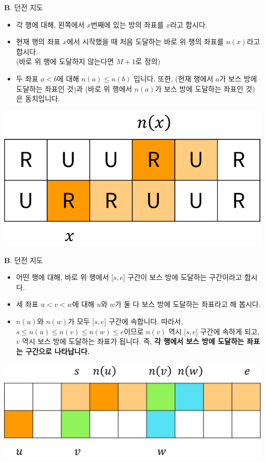 \begin{frame}{\textbf{B}. 던전 지도}
    \vspace{14pt}
    \begin{itemize}
        \item 각 행에 대해, 왼쪽에서 $x$번째에 있는 방의 좌표를 $x$라고 합시다.
        \item 현재 행의 좌표 $x$에서 시작했을 때 처음 도달하는 바로 위 행의 좌표를 $n(x)$라고 합시다. \\
        (바로 위 행에 도달하지 않는다면 $M+1$로 정의)
        \item 두 좌표 $a < b$에 대해 $n(a) \le n(b)$ 입니다. 또한, (현재 행에서 $a$가 보스 방에 도달하는 좌표인 것)과 (바로 위 행에서 $n(a)$가 보스 방에 도달하는 좌표인 것)은 동치입니다.
    \end{itemize}
    \begin{center}
        \includegraphics[width=0.35\linewidth]{../images/dungeon-map/b-basic.png}
    \end{center}
\end{frame}
        
\begin{frame}{\textbf{B}. 던전 지도}
    \vspace{14pt}
    \begin{itemize}
        \item 어떤 행에 대해, 바로 위 행에서 [$s, e$] 구간이 보스 방에 도달하는 구간이라고 합시다.
        \item 세 좌표 $u < v < w$에 대해 $u$와 $w$가 둘 다 보스 방에 도달하는 좌표라고 해 봅시다.
        \item $n(u)$와 $n(w)$가 모두 [$s, e$] 구간에 속합니다. 따라서, $s \le n(u) \le n(v) \le n(w) \le e$이므로 $n(v)$ 역시 [$s, e$] 구간에 속하게 되고, $v$ 역시 보스 방에 도달하는 좌표가 됩니다. 즉, \textbf{각 행에서 보스 방에 도달하는 좌표는 구간으로 나타납니다.}
    \end{itemize}
    \begin{center}
        \includegraphics[width=0.5\linewidth]{../images/dungeon-map/b-proof.png}
    \end{center}
\end{frame}

